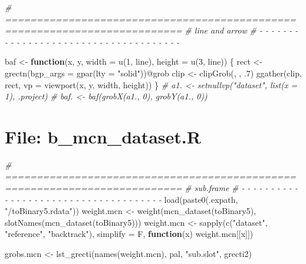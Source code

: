 \documentclass[
]{article}
\newenvironment{Shaded}{\begin{snugshade}}{\end{snugshade}}
\newcommand{\AttributeTok}[1]{\textcolor[rgb]{0.77,0.63,0.00}{#1}}
\newcommand{\CommentTok}[1]{\textcolor[rgb]{0.56,0.35,0.01}{\textit{#1}}}
\newcommand{\ControlFlowTok}[1]{\textcolor[rgb]{0.13,0.29,0.53}{\textbf{#1}}}
\newcommand{\DecValTok}[1]{\textcolor[rgb]{0.00,0.00,0.81}{#1}}
\newcommand{\FunctionTok}[1]{\textcolor[rgb]{0.00,0.00,0.00}{#1}}
\newcommand{\NormalTok}[1]{#1}
\newcommand{\OtherTok}[1]{\textcolor[rgb]{0.56,0.35,0.01}{#1}}
\newcommand{\SpecialCharTok}[1]{\textcolor[rgb]{0.00,0.00,0.00}{#1}}
\newcommand{\StringTok}[1]{\textcolor[rgb]{0.31,0.60,0.02}{#1}}
\begin{document}
\begin{Shaded}
\begin{Highlighting}[]
\CommentTok{\# ==========================================================================}
\CommentTok{\# line and arrow}
\CommentTok{\# {-} {-} {-} {-} {-} {-} {-} {-} {-} {-} {-} {-} {-} {-} {-} {-} {-} {-} {-} {-} {-} {-} {-} {-} {-} {-} {-} {-} {-} {-} {-} {-} {-} {-} {-} {-} {-}}

\NormalTok{baf }\OtherTok{\textless{}{-}} \ControlFlowTok{function}\NormalTok{(x, y, }\AttributeTok{width =} \FunctionTok{u}\NormalTok{(}\DecValTok{1}\NormalTok{, line), }\AttributeTok{height =} \FunctionTok{u}\NormalTok{(}\DecValTok{3}\NormalTok{, line)) \{}
\NormalTok{  rect }\OtherTok{\textless{}{-}} \FunctionTok{grectn}\NormalTok{(}\AttributeTok{bgp\_args =} \FunctionTok{gpar}\NormalTok{(}\AttributeTok{lty =} \StringTok{"solid"}\NormalTok{))}\SpecialCharTok{@}\NormalTok{grob}
\NormalTok{  clip }\OtherTok{\textless{}{-}} \FunctionTok{clipGrob}\NormalTok{(, , .}\DecValTok{7}\NormalTok{)}
  \FunctionTok{ggather}\NormalTok{(clip, rect, }\AttributeTok{vp =} \FunctionTok{viewport}\NormalTok{(x, y, width, height))}
\NormalTok{\}}
\CommentTok{\# a1. \textless{}{-} setnullvp("dataset", list(x = 1), .project)}
\CommentTok{\# baf. \textless{}{-} baf(grobX(a1., 0), grobY(a1., 0))}
\end{Highlighting}
\end{Shaded}

\hypertarget{file-b_mcn_dataset.r}{%
\section{File: b\_mcn\_dataset.R}\label{file-b_mcn_dataset.r}}

\begin{Shaded}
\begin{Highlighting}[]
\CommentTok{\# ==========================================================================}
\CommentTok{\# sub.frame}
\CommentTok{\# {-} {-} {-} {-} {-} {-} {-} {-} {-} {-} {-} {-} {-} {-} {-} {-} {-} {-} {-} {-} {-} {-} {-} {-} {-} {-} {-} {-} {-} {-} {-} {-} {-} {-} {-} {-} {-}}
\FunctionTok{load}\NormalTok{(}\FunctionTok{paste0}\NormalTok{(.expath, }\StringTok{"/toBinary5.rdata"}\NormalTok{))}
\NormalTok{weight.mcn }\OtherTok{\textless{}{-}} \FunctionTok{weight}\NormalTok{(}\FunctionTok{mcn\_dataset}\NormalTok{(toBinary5), }\FunctionTok{slotNames}\NormalTok{(}\FunctionTok{mcn\_dataset}\NormalTok{(toBinary5)))}
\NormalTok{weight.mcn }\OtherTok{\textless{}{-}} 
  \FunctionTok{sapply}\NormalTok{(}\FunctionTok{c}\NormalTok{(}\StringTok{"dataset"}\NormalTok{, }\StringTok{"reference"}\NormalTok{, }\StringTok{"backtrack"}\NormalTok{), }\AttributeTok{simplify =}\NormalTok{ F,}
         \ControlFlowTok{function}\NormalTok{(x) weight.mcn[[x]])}

\NormalTok{grobs.mcn }\OtherTok{\textless{}{-}} \FunctionTok{lst\_grecti}\NormalTok{(}\FunctionTok{names}\NormalTok{(weight.mcn), pal, }\StringTok{"sub.slot"}\NormalTok{, grecti2)}
\end{Highlighting}
\end{Shaded}
\end{document}
